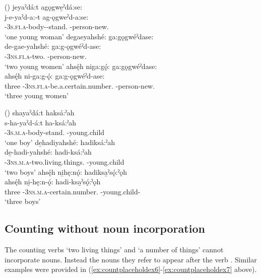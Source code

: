 \ea\label{ex:countplaceholdex6}  (\cite{michelson_ontario_2011})
\ea jeyaˀdá:t agǫgwe̱ˀdá:se:\\
\gll j-e-yaˀd-a:-t ag-ǫgweˀd-a:se:\\
 {\repetitive}-\textsc{3s.fi.a}-body-{\joinerA}-stand.{\stative} -person-new.{\stative}\\
\glt `one young woman'
\ex degaeyahshé: ga:gǫgwéˀdase:\\
\gll de-gae-yahshé: ga:g-ǫgwéˀd-ase:\\
 {\dualic}-\textsc{3ns.fi.a}-two.{\stative}  -person-new.{\stative}\\
\glt `two young women'
\ex ahsę́h niga:gǫ́: ga:gǫgwéˀdase:  \\
\gll ahsę́h ni-ga:g-ǫ́: ga:g-ǫgwéˀd-ase:\\
 three {\partitive}-\textsc{3ns.fi.a}-be.a.certain.number.{\stative}  -person-new.{\stative}\\
\glt ‘three young women’
\z
\z

\ea\label{ex:countplaceholdex7}  (\cite{michelson_ontario_2011})
\ea shayaˀdá:t haksá:ˀah\\
\gll s-ha-yaˀd-á:t ha-ksá:ˀah\\
 {\repetitive}-\textsc{3s.m.a}-body-stand.{\stative}  -young.child\\
\glt `one boy'
\ex de̱hadiyahshé: hadiksá:ˀah\\
\gll de̱-hadi-yahshé: hadi-ksá:ˀah\\
 {\dualic}-\textsc{3ns.m.a}-two.living.things.{\stative}  -young.child\\
\glt `two boys'
\ex ahsę́h ni̱hę:nǫ́: hadiksa̱ˀsǫ́:ˀǫh \\
\gll ahsę́h ni̱-hę:n-ǫ́: hadi-ksa̱ˀsǫ́:ˀǫh\\
three  {\partitive}-\textsc{3ns.m.a}-certain.number.{\stative}  -young.child-{\pluralizer}\\
\glt ‘three boys’
\z
\z

\subsection{Counting without noun incorporation} \label{ch:Counting without noun incorporation}
The counting verbs  ‘two living things’ and  ‘a number of things’ cannot incorporate nouns. Instead the nouns they refer to appear after the verb . Similar examples were provided in (\ref{ex:countplaceholdex6}-\ref{ex:countplaceholdex7} above).

